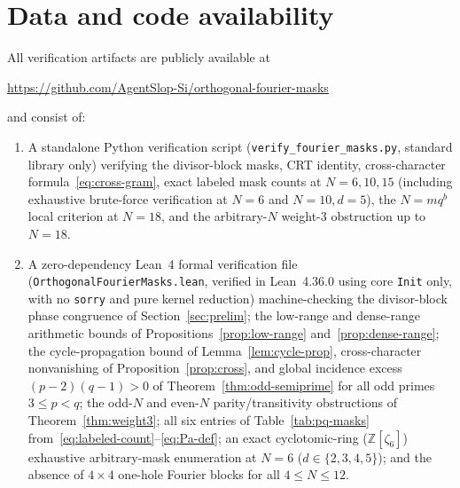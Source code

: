 \documentclass[11pt,reqno]{amsart}
\numberwithin{equation}{section}
\theoremstyle{definition}
\theoremstyle{remark}
\newcommand{\Z}{\mathbb{Z}}
\begin{document}
\section*{Data and code availability}
All verification artifacts are publicly available at
\begin{center}
\url{https://github.com/AgentSlop-Si/orthogonal-fourier-masks}
\end{center}
and consist of:
\begin{enumerate}[label=(\arabic*),leftmargin=2em]
\item A standalone Python verification script (\texttt{verify\_fourier\_masks.py}, standard library only) verifying the divisor-block masks, CRT identity, cross-character formula~\eqref{eq:cross-gram}, exact labeled mask counts at $N=6,10,15$ (including exhaustive brute-force verification at $N=6$ and $N=10,d=5$), the $N=mq^b$ local criterion at $N=18$, and the arbitrary-$N$ weight-$3$ obstruction up to $N=18$.
\item A zero-dependency Lean~4 formal verification file (\texttt{OrthogonalFourierMasks.lean}, verified in Lean~4.36.0 using core \texttt{Init} only, with no \texttt{sorry} and pure kernel reduction) machine-checking the divisor-block phase congruence of Section~\ref{sec:prelim}; the low-range and dense-range arithmetic bounds of Propositions~\ref{prop:low-range} and~\ref{prop:dense-range}; the cycle-propagation bound of Lemma~\ref{lem:cycle-prop}, cross-character nonvanishing of Proposition~\ref{prop:cross}, and global incidence excess $(p-2)(q-1)>0$ of Theorem~\ref{thm:odd-semiprime} for all odd primes $3\le p<q$; the odd-$N$ and even-$N$ parity/transitivity obstructions of Theorem~\ref{thm:weight3}; all six entries of Table~\ref{tab:pq-masks} from~\eqref{eq:labeled-count}--\eqref{eq:Pa-def}; an exact cyclotomic-ring ($\Z[\zeta_6]$) exhaustive arbitrary-mask enumeration at $N=6$ ($d\in\{2,3,4,5\}$); and the absence of $4\times 4$ one-hole Fourier blocks for all $4\le N\le 12$.
\end{enumerate}



\end{document}
